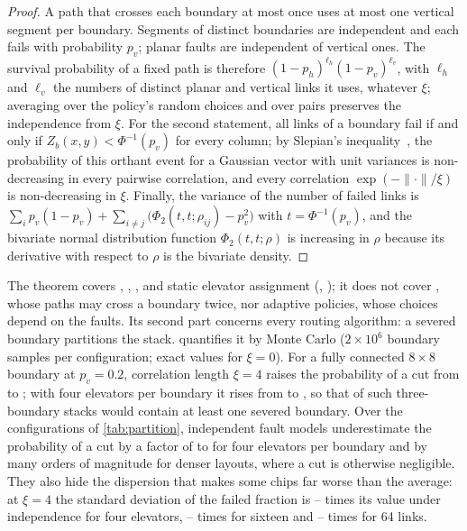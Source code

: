 \begin{proof}
A path that crosses each boundary at most once uses at most one vertical segment per boundary. Segments of distinct boundaries are independent and each fails with probability $p_v$; planar faults are independent of vertical ones. The survival probability of a fixed path is therefore $(1-p_h)^{\ell_h}(1-p_v)^{\ell_v}$, with $\ell_h$ and $\ell_v$ the numbers of distinct planar and vertical links it uses, whatever $\xi$; averaging over the policy's random choices and over pairs preserves the independence from $\xi$. For the second statement, all links of a boundary fail if and only if $Z_b(x,y)<\Phi^{-1}(p_v)$ for every column; by Slepian's inequality~\cite{slepian1962}, the probability of this orthant event for a Gaussian vector with unit variances is non-decreasing in every pairwise correlation, and every correlation $\exp(-\lVert\cdot\rVert/\xi)$ is non-decreasing in $\xi$. Finally, the variance of the number of failed links is $\sum_i p_v(1-p_v)+\sum_{i\neq j}\bigl(\Phi_2(t,t;\rho_{ij})-p_v^2\bigr)$ with $t=\Phi^{-1}(p_v)$, and the bivariate normal distribution function $\Phi_2(t,t;\rho)$ is increasing in $\rho$ because its derivative with respect to $\rho$ is the bivariate density.
\end{proof}

The theorem covers , , ,  and static elevator assignment (, ); it does not cover , whose paths may cross a boundary twice, nor adaptive policies, whose choices depend on the faults. Its second part concerns every routing algorithm: a severed boundary partitions the stack.  quantifies it by Monte Carlo ($2\times10^6$ boundary samples per configuration; exact values for $\xi=0$). For a fully connected $8\times8$ boundary at $p_v=0.2$, correlation length $\xi=4$ raises the probability of a cut from  to ; with four elevators per boundary it rises from  to , so that  of such three-boundary stacks would contain at least one severed boundary. Over the configurations of \cref{tab:partition}, independent fault models underestimate the probability of a cut by a factor of  to  for four elevators per boundary and by many orders of magnitude for denser layouts, where a cut is otherwise negligible. They also hide the dispersion that makes some chips far worse than the average: at $\xi=4$ the standard deviation of the failed fraction is -- times its value under independence for four elevators, -- times for sixteen and -- times for 64 links.

